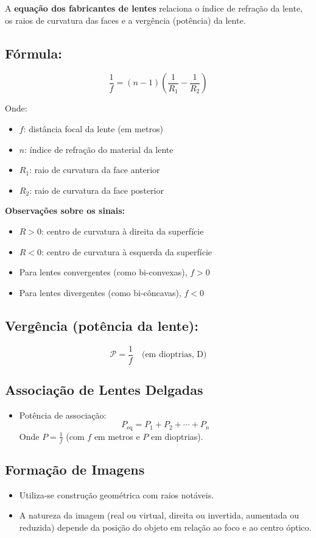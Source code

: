 \documentclass[a4paper,12pt]{article}
\begin{document}
\begin{multicols}{2}
A \textbf{equação dos fabricantes de lentes} relaciona o índice de refração da lente, os raios de curvatura das faces e a vergência (potência) da lente.

\subsection{Fórmula:}

\[
\frac{1}{f} = (n - 1) \left( \frac{1}{R_1} - \frac{1}{R_2} \right)
\]

Onde:
\begin{itemize}
  \item \( f \): distância focal da lente (em metros)
  \item \( n \): índice de refração do material da lente
  \item \( R_1 \): raio de curvatura da face anterior
  \item \( R_2 \): raio de curvatura da face posterior
\end{itemize}

\textbf{Observações sobre os sinais:}
\begin{itemize}
  \item \( R > 0 \): centro de curvatura à direita da superfície
  \item \( R < 0 \): centro de curvatura à esquerda da superfície
  \item Para lentes convergentes (como bi-convexas), \( f > 0 \)
  \item Para lentes divergentes (como bi-côncavas), \( f < 0 \)
\end{itemize}

\subsection{Vergência (potência da lente):}

\[
\mathcal{P} = \frac{1}{f} \quad \text{(em dioptrias, D)}
\]

\subsection{Associação de Lentes Delgadas}
\begin{itemize}
    \item Potência de associação:
    \[
        P_{\text{eq}} = P_1 + P_2 + \cdots + P_n
    \]
    Onde $P = \frac{1}{f}$ (com $f$ em metros e $P$ em dioptrias).
\end{itemize}

\subsection{Formação de Imagens}
\begin{itemize}
    \item Utiliza-se construção geométrica com raios notáveis.
    \item A natureza da imagem (real ou virtual, direita ou invertida, aumentada ou reduzida) depende da posição do objeto em relação ao foco e ao centro óptico.
\end{itemize}


\end{multicols}
\end{document}
